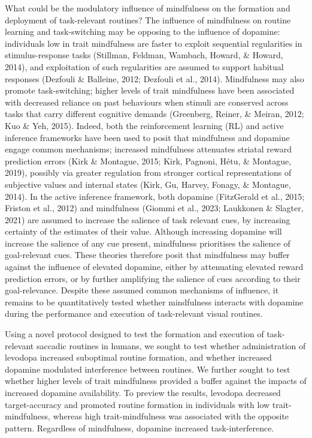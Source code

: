\documentclass[
  man]{apa6}
\begin{document}
What could be the modulatory influence of mindfulness on the formation and deployment of task-relevant routines? The influence of mindfulness on routine learning and task-switching may be opposing to the influence of dopamine: individuals low in trait mindfulness are faster to exploit sequential regularities in stimulus-response tasks (Stillman, Feldman, Wambach, Howard, \& Howard, 2014), and exploitation of such regularities are assumed to support habitual responses (Dezfouli \& Balleine, 2012; Dezfouli et al., 2014). Mindfulness may also promote task-switching; higher levels of trait mindfulness have been associated with decreased reliance on past behaviours when stimuli are conserved across tasks that carry different cognitive demands (Greenberg, Reiner, \& Meiran, 2012; Kuo \& Yeh, 2015). Indeed, both the reinforcement learning (RL) and active inference frameworks have been used to posit that mindfulness and dopamine engage common mechanisms; increased mindfulness attenuates striatal reward prediction errors (Kirk \& Montague, 2015; Kirk, Pagnoni, Hétu, \& Montague, 2019), possibly via greater regulation from stronger cortical
representations of subjective values and internal states (Kirk, Gu, Harvey, Fonagy, \& Montague, 2014). In the active inference framework, both dopamine (FitzGerald et al., 2015; Friston et al., 2012) and mindfulness (Giommi et al., 2023; Laukkonen \& Slagter, 2021) are assumed to increase the salience of task relevant cues, by increasing certainty of the estimates of their value. Although increasing dopamine will increase the salience of any cue present, mindfulness prioritises the salience of goal-relevant cues. These theories therefore posit that mindfulness may buffer against the influence of elevated dopamine, either by attenuating elevated reward prediction errors, or by further amplifying the salience of cues according to their goal-relevance. Despite these assumed common mechanisms of influence, it remains to be quantitatively tested whether mindfulness interacts with dopamine during the performance and execution of task-relevant visual routines.

Using a novel protocol designed to test the formation and execution of task-relevant saccadic routines in humans, we sought to test whether administration of levodopa increased suboptimal routine formation, and whether increased dopamine modulated interference between routines. We further sought to test whether higher levels of trait mindfulness provided a buffer against the impacts of increased dopamine availability. To preview the results, levodopa decreased target-accuracy and promoted routine formation in individuals with low trait-mindfulness, whereas high trait-mindfulness was associated with the opposite pattern. Regardless of mindfulness, dopamine increased task-interference.
\end{document}
